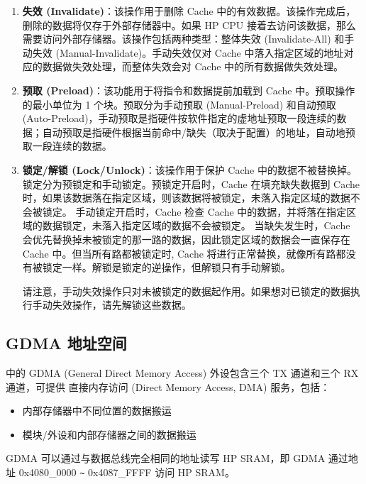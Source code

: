 \documentclass[main\_\_CN.tex]{subfiles}
\begin{document}
\begin{enumerate}
\item \textbf{失效 (Invalidate)}：该操作用于删除 Cache 中的有效数据。该操作完成后，删除的数据将仅存于外部存储器中。如果 HP CPU 接着去访问该数据，那么需要访问外部存储器。该操作包括两种类型：整体失效 (Invalidate-All) 和手动失效 (Manual-Invalidate)。手动失效仅对 Cache 中落入指定区域的地址对应的数据做失效处理，而整体失效会对 Cache 中的所有数据做失效处理。

\item \textbf{预取 (Preload)}：该功能用于将指令和数据提前加载到 Cache 中。预取操作的最小单位为 1 个块。预取分为手动预取 (Manual-Preload) 和自动预取 (Auto-Preload)，手动预取是指硬件按软件指定的虚地址预取一段连续的数据；自动预取是指硬件根据当前命中/缺失（取决于配置）的地址，自动地预取一段连续的数据。


\item \textbf{锁定/解锁 (Lock/Unlock)}：该操作用于保护 Cache 中的数据不被替换掉。锁定分为预锁定和手动锁定。预锁定开启时，Cache 在填充缺失数据到 Cache 时，如果该数据落在指定区域，则该数据将被锁定，未落入指定区域的数据不会被锁定。 手动锁定开启时，Cache 检查 Cache 中的数据，并将落在指定区域的数据锁定，未落入指定区域的数据不会被锁定。
当缺失发生时，Cache 会优先替换掉未被锁定的那一路的数据，因此锁定区域的数据会一直保存在 Cache 中。但当所有路都被锁定时, Cache 将进行正常替换，就像所有路都没有被锁定一样。解锁是锁定的逆操作，但解锁只有手动解锁。

请注意，手动失效操作只对未被锁定的数据起作用。如果想对已锁定的数据执行手动失效操作，请先解锁这些数据。

\end{enumerate}

\subsection{GDMA 地址空间}

\chipname{} 中的 GDMA (General Direct Memory Access) 外设包含三个 TX 通道和三个 RX 通道，可提供 直接内存访问 (Direct Memory Access, DMA) 服务，包括：

\begin{itemize}
    \item 内部存储器中不同位置的数据搬运
    \item 模块/外设和内部存储器之间的数据搬运
\end{itemize}

GDMA 可以通过与数据总线完全相同的地址读写 HP SRAM，即 GDMA 通过地址 0x4080\_0000 \verb+~+ 0x4087\_FFFF 访问 HP SRAM。
\end{document}
